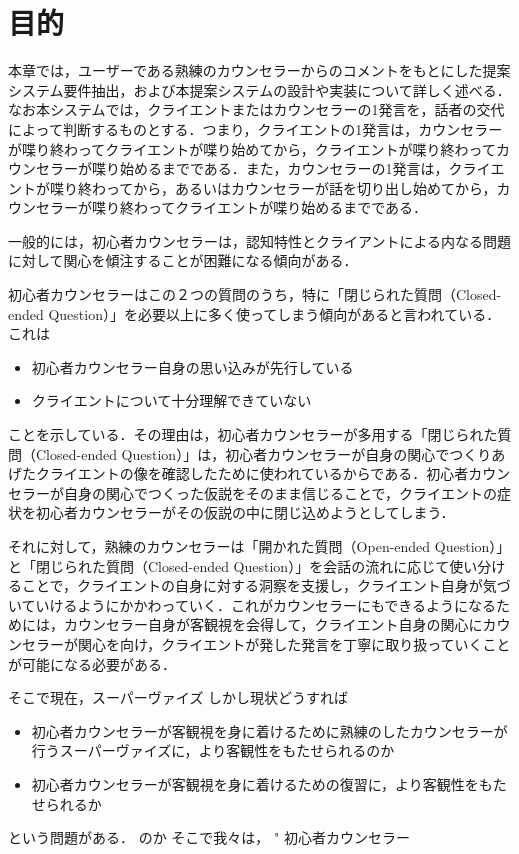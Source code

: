 \documentclass[shuuron]{kuee}
\begin{document}
\section{目的}

本章では，ユーザーである熟練のカウンセラーからのコメントをもとにした提案システム要件抽出，および本提案システムの設計や実装について詳しく述べる．なお本システムでは，クライエントまたはカウンセラーの1発言を，話者の交代によって判断するものとする．つまり，クライエントの1発言は，カウンセラーが喋り終わってクライエントが喋り始めてから，クライエントが喋り終わってカウンセラーが喋り始めるまでである．また，カウンセラーの1発言は，クライエントが喋り終わってから，あるいはカウンセラーが話を切り出し始めてから，カウンセラーが喋り終わってクライエントが喋り始めるまでである．


一般的には，初心者カウンセラーは，認知特性とクライアントによる内なる問題に対して関心を傾注することが困難になる傾向がある．

初心者カウンセラーはこの２つの質問のうち，特に「閉じられた質問（Closed-ended Question）」を必要以上に多く使ってしまう傾向があると言われている．これは

\begin{itemize}
  \item 初心者カウンセラー自身の思い込みが先行している
  \item クライエントについて十分理解できていない
\end{itemize}
ことを示している．その理由は，初心者カウンセラーが多用する「閉じられた質問（Closed-ended Question）」は，初心者カウンセラーが自身の関心でつくりあげたクライエントの像を確認したために使われているからである．初心者カウンセラーが自身の関心でつくった仮説をそのまま信じることで，クライエントの症状を初心者カウンセラーがその仮説の中に閉じ込めようとしてしまう．

それに対して，熟練のカウンセラーは「開かれた質問（Open-ended Question）」と「閉じられた質問（Closed-ended Question）」を会話の流れに応じて使い分けることで，クライエントの自身に対する洞察を支援し，クライエント自身が気づいていけるようにかかわっていく．これがカウンセラーにもできるようになるためには，カウンセラー自身が客観視を会得して，クライエント自身の関心にカウンセラーが関心を向け，クライエントが発した発言を丁寧に取り扱っていくことが可能になる必要がある．

そこで現在，スーパーヴァイズ
しかし現状どうすれば
\begin{itemize}
  \item 初心者カウンセラーが客観視を身に着けるために熟練のしたカウンセラーが行うスーパーヴァイズに，より客観性をもたせられるのか
  \item 初心者カウンセラーが客観視を身に着けるための復習に，より客観性をもたせられるか
\end{itemize}
という問題がある．
のか
そこで我々は，
"	初心者カウンセラー
\end{document}
